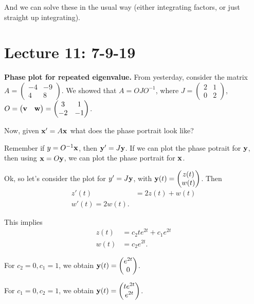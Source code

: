 \documentclass{article}
\newcommand{\mat}[1]{\begin{pmatrix}#1\end{pmatrix}}
\begin{document}
And we can solve these in the usual way (either integrating factors, or just straight up integrating).

\section{Lecture 11: 7-9-19}

{\bf Phase plot for repeated eigenvalue.} From yesterday, consider the matrix $A = \mat{-4 & -9 \\ 4 & 8}$.  We showed that $A = O J O^{-1}$, where $J = \mat{2 & 1 \\ 0 & 2}$, $O = \mat{\mbf{v} & \mbf{w}} = \mat{3 & 1 \\ -2 & -1}$.

Now, given $\mathbf{x}' = A \mathbf{x}$ what does the phase portrait look like?

Remember if $y = O^{-1} \mathbf{x}$, then $\mathbf{y}' = J \mathbf{y}$.  If we can plot the phase potrait for $\mathbf{y}$, then using $\mathbf{x} = O \mathbf{y}$, we can plot the phase portrait for $\mathbf{x}$.

Ok, so let's consider the plot for $y' = J \mathbf{y}$, with $\mbf{y}(t) = \mat{z(t) \\ w(t)}$.  Then
\begin{align*}
  z'(t) &= 2 z(t) + w(t) \\
  w'(t) = 2 w(t).
\end{align*}

This implies
\begin{align*}
  z(t) &= c_2 t e^{2t} + c_1 e^{2t} \\
  w(t) &= c_2 e^{2t}.
\end{align*}

For $c_2 = 0, c_1 = 1$, we obtain $\mbf{y}(t) = \mat{e^{2t} \\ 0}$.

For $c_1 = 0, c_2 = 1$, we obtain $\mbf{y}(t) = \mat{t e^{2t} \\ e^{2t}}$.
\end{document}
